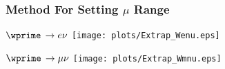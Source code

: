 \begin{frame}
	\frametitle{Method For Setting $\mu$ Range}
	
		\begin{center}
		$\wprime\, \rightarrow e\nu$
		\texttt{[image: plots/Extrap\_Wenu.eps]}
		\end{center}
		\begin{center}
		$\wprime\, \rightarrow \mu\nu$
		\texttt{[image: plots/Extrap\_Wmnu.eps]}
		\end{center}
	\cend

\end{frame}